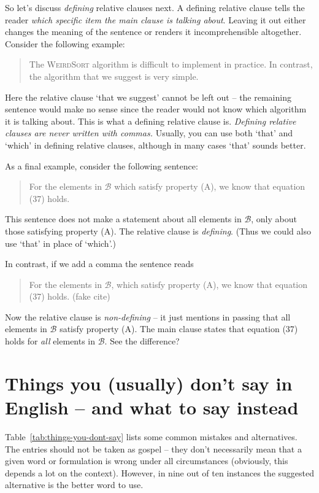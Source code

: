 So let's discuss \emph{defining} relative clauses next. A defining
relative clause tells the reader \emph{which specific item the main
  clause is talking about}. Leaving it out either changes the meaning
of the sentence or renders it incomprehensible altogether.  Consider
the following example:

\begin{quote}
  The \textsc{WeirdSort} algorithm is difficult to implement in
  practice. In contrast, the algorithm that we suggest is very simple.
\end{quote}

Here the relative clause `that we suggest' cannot be left out -- the
remaining sentence would make no sense since the reader would not know
which algorithm it is talking about. This is what a defining relative
clause is. \textit{Defining relative clauses are never written with
  commas.} Usually, you can use both `that' and `which' in defining
relative clauses, although in many cases `that' sounds better.

As a final example, consider the following sentence:
\begin{quote}
  For the elements in \(\mathcal{B}\) which satisfy property (A), we
  know that equation (37) holds.
\end{quote}
This sentence does not make a statement about all elements in
\(\mathcal{B}\), only about those satisfying property (A). The relative
clause is \emph{defining}. (Thus we could also use `that' in place of
`which'.)

In contrast, if we add a comma the sentence reads
\begin{quote}
  For the elements in \(\mathcal{B}\), which satisfy property (A), we
  know that equation (37) holds. (fake cite)\cite{bringhurst1996ets}
\end{quote}

Now the relative clause is \emph{non-defining} -- it just mentions in
passing that all elements in \(\mathcal{B}\) satisfy property (A). The
main clause states that equation (37) holds for \emph{all} elements in
\(\mathcal{B}\). See the difference?


\section*[Things you (usually) don't say in English]%
{Things you (usually) don't say in English -- and what to say
  instead}
\label{sec:list}

Table~\ref{tab:things-you-dont-say} lists some common mistakes and
alternatives.  The entries should not be taken as gospel -- they don't
necessarily mean that a given word or formulation is wrong under all
circumstances (obviously, this depends a lot on the context). However,
in nine out of ten instances the suggested alternative is the better
word to use.

